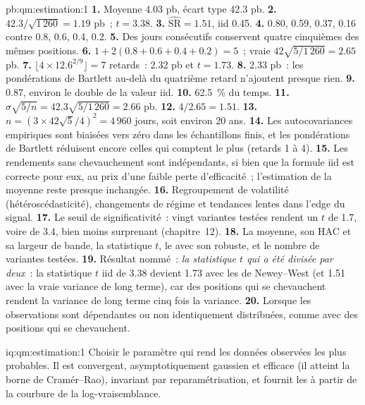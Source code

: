\begin{solution}{pb:qm:estimation:1}
\textbf{1.} Moyenne 4.03 pb, écart type 42.3 pb.
\textbf{2.} $42.3/\sqrt{1\,260} = 1.19$ pb~; $t = 3.38$.
\textbf{3.} $\widehat{\mathrm{SR}} = 1.51$,  iid 0.45.
\textbf{4.} 0.80, 0.59, 0.37, 0.16 contre 0.8, 0.6, 0.4, 0.2.
\textbf{5.} Des jours consécutifs conservent quatre cinquièmes des mêmes positions.
\textbf{6.} $1 + 2(0.8 + 0.6 + 0.4 + 0.2) = 5$~;  vraie $42\sqrt{5/1\,260} = 2.65$ pb.
\textbf{7.} $\lfloor4 \times 12.6^{2/9}\rfloor = 7$ retards~: 2.32 pb et $t = 1.73$.
\textbf{8.} 2.33 pb~: les pondérations de Bartlett au-delà du quatrième retard n'ajoutent presque rien.
\textbf{9.} 0.87, environ le double de la valeur iid.
\textbf{10.} 62.5~\% du temps.
\textbf{11.} $\hat\sigma\sqrt{5/n} = 42.3\sqrt{5/1\,260} = 2.66$ pb.
\textbf{12.} $4/2.65 = 1.51$.
\textbf{13.} $n = (3 \times 42\sqrt5/4)^2 = 4\,960$ jours, soit environ 20 ans.
\textbf{14.} Les autocovariances empiriques sont biaisées vers zéro dans les échantillons finis, et les pondérations de Bartlett réduisent encore celles qui
comptent le plus (retards 1 à 4).
\textbf{15.} Les rendements sans chevauchement sont indépendants, si bien que la formule iid est correcte pour eux, au prix d'une faible perte d'efficacité~;
l'estimation de la moyenne reste presque inchangée.
\textbf{16.} Regroupement de volatilité (hétéroscédasticité), changements de régime et tendances lentes dans l'edge du signal.
\textbf{17.} Le seuil de significativité~: vingt variantes testées rendent un $t$ de 1.7, voire de 3.4, bien moins surprenant (chapitre~12).
\textbf{18.} La moyenne, son  HAC et sa largeur de bande, la statistique $t$, le  avec son  robuste,
et le nombre de variantes testées.
\textbf{19.} Résultat nommé~: \emph{la statistique $t$ qui a été divisée par deux}~: la statistique $t$ iid de 3.38 devient 1.73 avec les 
de Newey--West (et 1.51 avec la vraie variance de long terme), car des positions qui se chevauchent rendent la variance de long terme cinq
fois la variance.
\textbf{20.} Lorsque les observations sont dépendantes ou non identiquement distribuées, comme avec des positions qui se chevauchent.
\end{solution}

\begin{solution}{iq:qm:estimation:1}
Choisir le paramètre qui rend les données observées les plus probables. Il est convergent, asymptotiquement gaussien et efficace (il
atteint la borne de Cramér--Rao), invariant par reparamétrisation, et fournit les  à partir de la courbure de la
log-vraisemblance.
\end{solution}

